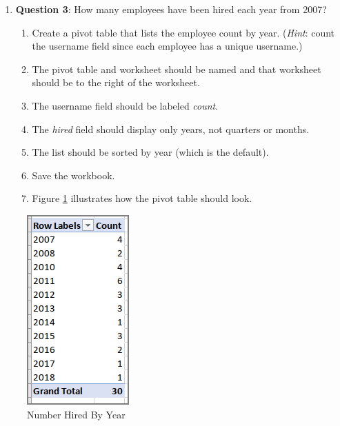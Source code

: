 \begin{enumerate}[resume]
	\item{\textbf{Question 3}: How many employees have been hired each year from 2007?}
	
	\begin{enumerate}
		\item Create a pivot table that lists the employee count by year. (\textit{Hint}: count the username field since each employee has a unique username.)
		\item The pivot table and worksheet should be named  and that worksheet should be to the right of the  worksheet.
		\item The username field should be labeled \textit{count}. 
		\item The \textit{hired} field should display only years, not quarters or months.
		\item The list should be sorted by year (which is the default).
		\item Save the workbook.
		\item Figure \ref{07:fig60} illustrates how the pivot table should look.
	\end{enumerate}
	
\end{enumerate}

\begin{figure}[H]
	\centering
	\includegraphics[width=\maxwidth{.75\linewidth}]{gfx/ch07_fig60}
	\caption{Number Hired By Year}
	\label{07:fig60}
\end{figure}

